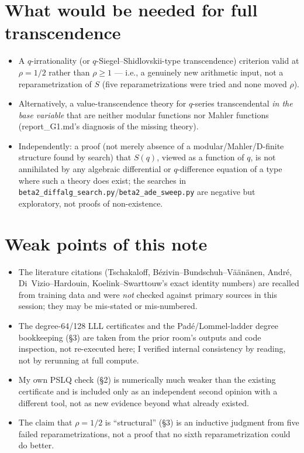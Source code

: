 \documentclass[11pt]{article}
\begin{document}
\section{What would be needed for full transcendence}

\begin{itemize}
\item A $q$-irrationality (or $q$-Siegel--Shidlovskii-type transcendence) criterion valid at
$\rho=1/2$ rather than $\rho\ge1$ --- i.e., a genuinely new arithmetic input, not a
reparametrization of $S$ (five reparametrizations were tried and none moved $\rho$).
\item Alternatively, a value-transcendence theory for $q$-series transcendental \emph{in the
base variable} that are neither modular functions nor Mahler functions (report\_G1.md's
diagnosis of the missing theory).
\item Independently: a proof (not merely absence of a modular/Mahler/D-finite structure found
by search) that $S(q)$, viewed as a function of $q$, is not annihilated by any algebraic
differential or $q$-difference equation of a type where such a theory does exist; the searches
in \texttt{beta2\_diffalg\_search.py}/\texttt{beta2\_ade\_sweep.py} are negative but exploratory,
not proofs of non-existence.
\end{itemize}

\section{Weak points of this note}

\begin{itemize}
\item The literature citations (Tschakaloff, Bézivin--Bundschuh--Väänänen, André,
Di~Vizio--Hardouin, Koelink--Swarttouw's exact identity numbers) are recalled from training
data and were \emph{not} checked against primary sources in this session; they may be
mis-stated or mis-numbered.
\item The degree-64/128 LLL certificates and the Padé/Lommel-ladder degree bookkeeping
(\S3) are taken from the prior room's outputs and code inspection, not re-executed here; I
verified internal consistency by reading, not by rerunning at full compute.
\item My own PSLQ check (\S2) is numerically much weaker than the existing certificate and
is included only as an independent second opinion with a different tool, not as new evidence
beyond what already existed.
\item The claim that $\rho=1/2$ is ``structural'' (\S3) is an inductive judgment from five
failed reparametrizations, not a proof that no sixth reparametrization could do better.
\end{itemize}
\end{document}

